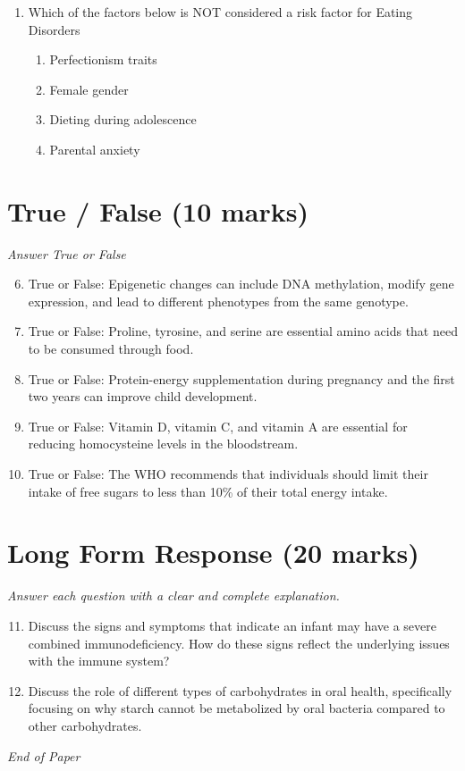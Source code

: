 \documentclass[12pt]{article}
\begin{document}
\begin{enumerate}[label=\arabic*.]
\begin{enumerate}[label=(\alph*)]
    \item Consumption estimates give higher values than those derived from other types of surveys
    \item No information is available on the distribution of consumption within a country
    \item All of the options given are correct
\end{enumerate}
\item Which of the factors below is NOT considered a risk factor for Eating Disorders
\begin{enumerate}[label=(\alph*)]
    \item Perfectionism traits
    \item Female gender
    \item Dieting during adolescence
    \item Parental anxiety
\end{enumerate}
\end{enumerate}

\section*{True / False (10 marks)}
\textit{Answer True or False}
\begin{enumerate}[label=\arabic*.]
\setcounter{enumi}{5}
\item True or False: Epigenetic changes can include DNA methylation, modify gene expression, and lead to different phenotypes from the same genotype.
\item True or False: Proline, tyrosine, and serine are essential amino acids that need to be consumed through food.
\item True or False: Protein-energy supplementation during pregnancy and the first two years can improve child development.
\item True or False: Vitamin D, vitamin C, and vitamin A are essential for reducing homocysteine levels in the bloodstream.
\item True or False: The WHO recommends that individuals should limit their intake of free sugars to less than 10\% of their total energy intake.
\end{enumerate}

\section*{Long Form Response (20 marks)}
\textit{Answer each question with a clear and complete explanation.}
\begin{enumerate}[label=\arabic*.]
\setcounter{enumi}{10}
\item Discuss the signs and symptoms that indicate an infant may have a severe combined immunodeficiency. How do these signs reflect the underlying issues with the immune system?
\item Discuss the role of different types of carbohydrates in oral health, specifically focusing on why starch cannot be metabolized by oral bacteria compared to other carbohydrates.
\end{enumerate}

\vfill
\noindent\textit{End of Paper}
\end{document}
